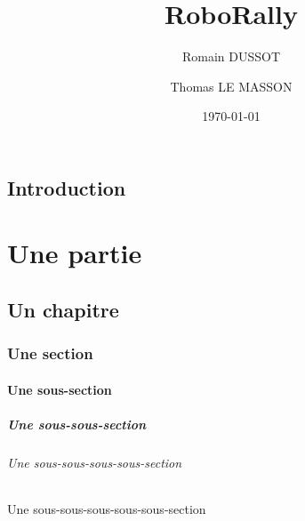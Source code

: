 \documentclass[a4paper,11pt]{report}
\title{RoboRally}
\author{Romain DUSSOT \and Thomas LE MASSON}
\date{\today}
\begin{document}
\maketitle 

	\chapter*{Introduction}
 
  	\part{Une partie}
   	\chapter{Un chapitre}
   	\section{Une section}
    	\subsection{Une sous-section}
 	\subsubsection{Une sous-sous-section}
 	\paragraph{Une sous-sous-sous-sous-section}
   	\subparagraph{Une sous-sous-sous-sous-sous-section}
 
\end{document}
